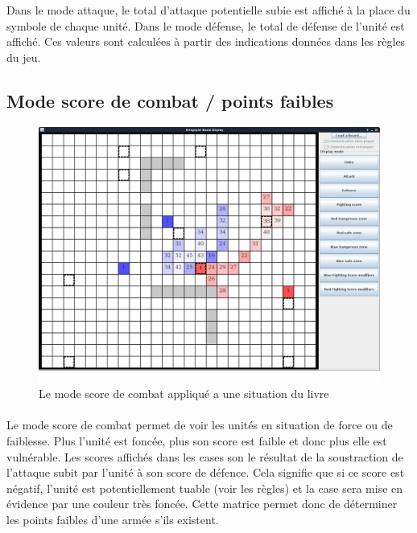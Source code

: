 			Dans le mode attaque, le total d'attaque potentielle subie est affiché à la place du symbole de chaque unité.
			Dans le mode défense, le total de défense de l'unité est affiché.
			Ces valeurs sont calculées à partir des indications données dans les règles du jeu.
			\clearpage	

		\subsection{Mode score de combat / points faibles}

			\begin{figure}[!h]
				\centerline{\includegraphics[scale=0.35]{images/screen_fscore.png}}
				\caption{Le mode score de combat appliqué a une situation du livre}
			\end{figure}
			
			\paragraph{}
			Le mode score de combat permet de voir les unités en situation de force ou de faiblesse.
			Plus l'unité est foncée, plus son score est faible et donc plus elle est vulnérable.
                        Les scores affichés dans les cases son le résultat de la soustraction de l'attaque subit par l'unité à son score de défence. Cela signifie que si ce score est négatif, l'unité est potentiellement tuable (voir les règles) et la case sera mise en évidence par une couleur très foncée.
			Cette matrice permet donc de déterminer les points faibles d'une armée s'ils existent.
			
